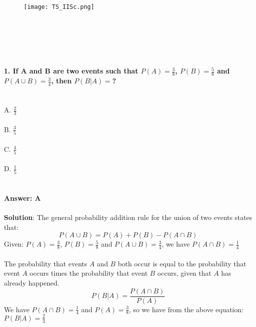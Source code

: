 \documentclass[prl,twocolumn,showpacs,preprintnumbers,superscriptaddress]{revtex4}
\theoremstyle{plain}
\theoremstyle{definition}
\begin{document}
\begin{widetext}
\\
\\
\\

\begin{wrapfigure}
\centering
\end{wrapfigure}
\begin{figure}[h!]
 \begin{right}
  \hfill\texttt{[image: TS\_IISc.png]}
 \end{right}
\end{figure}
\\
\\
\\
\\
\\
\noindent\textbf{1. If A and B are two events such that $P(A) = \frac{3}{8}$, $P(B) = \frac{5}{8}$ and $P(A\cup B) = \frac{3}{4}$, then $P(B|A) = $?}
\\
\\
\\
A. $\frac{2}{3}$
\\
\\
B. $\frac{3}{5}$
\\
\\
C. $\frac{4}{5}$
\\
\\
D. $\frac{1}{5}$
\\
\\
\\
\textbf{Answer: A}
\\
\\
\textbf{Solution}:
The general probability addition rule for the union of two events states that:
\\
\begin{equation}
    P(A\cup B) = P(A) + P(B) - P(A\cap B) {}\nonumber
\end{equation}
Given: $P(A) = \frac{3}{8}$, $P(B) = \frac{5}{8}$ and $P(A\cup B) = \frac{3}{4}$, we have $P(A\cap B) = \frac{1}{4}$
\\
\\
The probability that events $A$ and $B$ both occur is equal to the probability that event $A$ occurs times the probability that event $B$ occurs, given that $A$ has already happened.
\begin{equation}
    P(B|A) = \frac{P(A\cap B)}{P(A)} {}\nonumber
\end{equation}
We have $P(A\cap B) = \frac{1}{4}$ and $P(A) = \frac{3}{8}$, so we have from the above equation: $P(B|A) = \frac{2}{3}$

\end{widetext}
\end{document}
